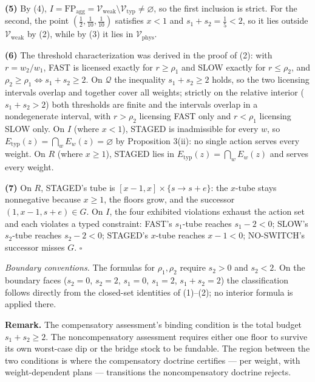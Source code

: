 \documentclass[11pt]{article}
\begin{document}
\textbf{(5)} By (4),
\(I = \mathrm{FP}_{\mathrm{agg}} = \mathcal{V}_{\mathrm{weak}} \setminus \mathcal{V}_{\mathrm{typ}} \neq \varnothing\),
so the first inclusion is strict. For the second, the point
\((\tfrac12, \tfrac1{10}, \tfrac1{10})\) satisfies \(x < 1\) and
\(s_1 + s_2 = \tfrac15 < 2\), so it lies outside
\(\mathcal{V}_{\mathrm{weak}}\) by (2), while by (3) it lies in
\(\mathcal{V}_{\mathrm{phys}}\).

\textbf{(6)} The threshold characterization was derived in the proof of
(2): with \(r = w_2 / w_1\), FAST is licensed exactly for
\(r \ge \rho_1\) and SLOW exactly for \(r \le \rho_2\), and
\(\rho_2 \ge \rho_1 \iff s_1 + s_2 \ge 2\). On \(\mathcal{Q}\) the
inequality \(s_1 + s_2 \ge 2\) holds, so the two licensing intervals
overlap and together cover all weights; strictly on the relative
interior (\(s_1 + s_2 > 2\)) both thresholds are finite and the
intervals overlap in a nondegenerate interval, with \(r > \rho_2\)
licensing FAST only and \(r < \rho_1\) licensing SLOW only. On \(I\)
(where \(x < 1\)), STAGED is inadmissible for every \(w\), so
\(E_{\mathrm{typ}}(z) = \bigcap_w E_w(z) = \varnothing\) by Proposition
3(ii): no single action serves every weight. On \(R\) (where
\(x \ge 1\)), STAGED lies in \(E_{\mathrm{typ}}(z) = \bigcap_w E_w(z)\)
and serves every weight.

\textbf{(7)} On \(R\), STAGED's tube is
\([x - 1, x] \times \{s \to s + e\}\): the \(x\)-tube stays nonnegative
because \(x \ge 1\), the floors grow, and the successor
\((1, x - 1, s + e) \in G\). On \(I\), the four exhibited violations
exhaust the action set and each violates a typed constraint: FAST's
\(s_1\)-tube reaches \(s_1 - 2 < 0\); SLOW's \(s_2\)-tube reaches
\(s_2 - 2 < 0\); STAGED's \(x\)-tube reaches \(x - 1 < 0\); NO-SWITCH's
successor misses \(G\). \ensuremath{\square}

\emph{Boundary conventions.} The formulas for \(\rho_1, \rho_2\) require
\(s_2 > 0\) and \(s_2 < 2\). On the boundary faces (\(s_2 = 0\),
\(s_2 = 2\), \(s_1 = 0\), \(s_1 = 2\), \(s_1 + s_2 = 2\)) the
classification follows directly from the closed-set identities of
(1)--(2); no interior formula is applied there.

\textbf{Remark.} The compensatory assessment's binding condition is the
total budget \(s_1 + s_2 \ge 2\). The noncompensatory assessment
requires either one floor to survive its own worst-case dip or the
bridge stock to be fundable. The region between the two conditions is
where the compensatory doctrine certifies --- per weight, with
weight-dependent plans --- transitions the noncompensatory doctrine
rejects.
\end{document}
